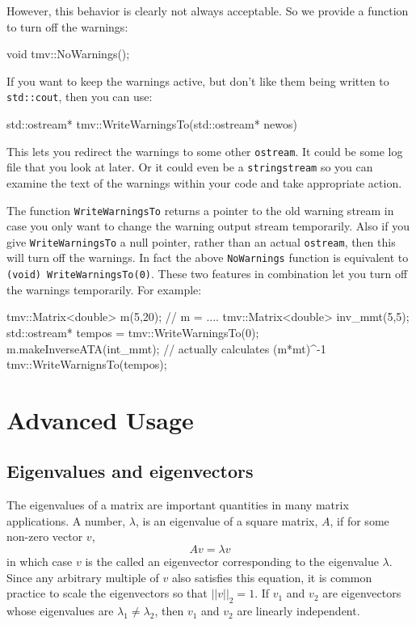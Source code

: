 \documentclass[twoside,letterpaper,11pt]{article}
\renewcommand{\tt}[1]{{\lstinline {#1}}}
\begin{document}
However, this behavior is clearly not always acceptable.  So we provide a function to 
turn off the warnings:
\begin{tmvcode}
void tmv::NoWarnings();
\end{tmvcode}

If you want to keep the warnings active, but don't like them being written to \tt{std::cout}, then 
you can use:
\begin{tmvcode}
std::ostream* tmv::WriteWarningsTo(std::ostream* newos)
\end{tmvcode}
This lets you redirect the warnings to some other \tt{ostream}.  It could be some log file
that you look at later.  Or it could even be a \tt{stringstream} so you can examine the text
of the warnings within your code and take appropriate action.

The function \tt{WriteWarningsTo} returns a pointer to the old warning stream
in case you only want to change the warning output stream temporarily.
Also if you give \tt{WriteWarningsTo} a null pointer, rather than an actual \tt{ostream},
then this will turn off the warnings.  In fact the above \tt{NoWarnings} function is 
equivalent to \tt{(void) WriteWarningsTo(0)}.  These two features in combination
let you turn off the warnings temporarily.  For example:
\begin{tmvcode}
tmv::Matrix<double> m(5,20);
// m = ....
tmv::Matrix<double> inv_mmt(5,5);
std::ostream* tempos = tmv::WriteWarningsTo(0);
m.makeInverseATA(int_mmt); // actually calculates (m*mt)^-1
tmv::WriteWarnignsTo(tempos);
\end{tmvcode}

\newpage
\section{Advanced Usage}

\subsection{Eigenvalues and eigenvectors}
\label{Eigenvalues}

The eigenvalues of a matrix are important quantities in many matrix applications.
A number, $\lambda$, is an eigenvalue of a square matrix, $A$, if for some
non-zero vector $v$,
\begin{equation*}
A v = \lambda v
\end{equation*}
in which case $v$ is the called an eigenvector corresponding to the eigenvalue $\lambda$.
Since any arbitrary multiple of $v$ also satisfies this equation, it is common practice
to scale the eigenvectors so that $||v||_2 = 1$.
If $v_1$ and $v_2$ are eigenvectors whose eigenvalues are 
$\lambda_1 \neq \lambda_2$, then $v_1$ and $v_2$ are linearly independent.
\end{document}
